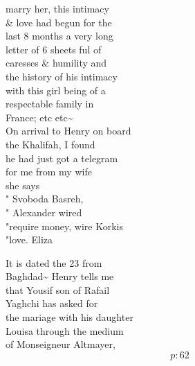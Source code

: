 \documentclass{report}
\begin{document}
	\par{
 	marry her, this intimacy\ \\\& love had begun for the\ \\last 8 months a very long\ \\letter of 6 sheets ful of\ \\caresses \& humility and\ \\the history of his intimacy\ \\with this girl being of a\ \\respectable family in\ \\France; etc etc\~{}\ \\On arrival to Henry on board\ \\the Khalifah, I found\ \\he had just got a telegram\ \\for me from my wife\ \\she says\ \\" Svoboda Basreh,\ \\" Alexander wired\ \\"require money, wire Korkis\ \\"love. Eliza\ \\
	}

	\par{
 	It is dated the 23 from\ \\Baghdad\~{} Henry tells me\ \\that Yousif son of Rafail\ \\Yaghchi has asked for\ \\the mariage with his daughter\ \\Louisa through the medium\ \\of Monseigneur Altmayer,\ \\
  \[p: 62 \]

	}

\end{document}
